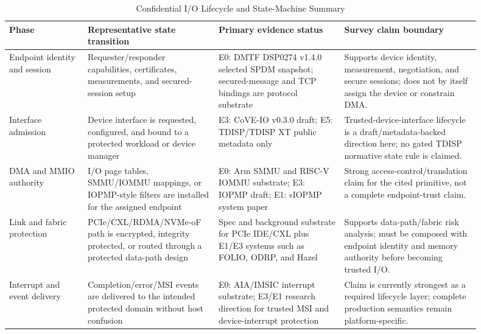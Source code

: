 \begin{table}[t]
\centering
\scriptsize
\caption{Confidential I/O Lifecycle and State-Machine Summary}
\label{tab:confidential_io_lifecycle}
\begin{tabular}{@{}p{0.15\linewidth}p{0.25\linewidth}p{0.24\linewidth}p{0.26\linewidth}@{}}
\toprule
\textbf{Phase} & \textbf{Representative state transition} & \textbf{Primary evidence status} & \textbf{Survey claim boundary} \\ \midrule
Endpoint identity and session & Requester/responder capabilities, certificates, measurements, and secured-session setup & E0: DMTF DSP0274 v1.4.0 selected SPDM snapshot; secured-message and TCP bindings are protocol substrate~\cite{dmtf_spdm_2025,dmtf_spdm_secured_messages_2025,dmtf_spdm_tcp_2024} & Supports device identity, measurement, negotiation, and secure sessions; does not by itself assign the device or constrain DMA. \\
Interface admission & Device interface is requested, configured, and bound to a protected workload or device manager & E3: CoVE-IO v0.3.0 draft; E5: TDISP/TDISP XT public metadata only~\cite{riscv_cove_io_2026,pcisig_tdisp_2022,pcisig_tdisp_xt_2025} & Trusted-device-interface lifecycle is a draft/metadata-backed direction here; no gated TDISP normative state rule is claimed. \\
DMA and MMIO authority & I/O page tables, SMMU/IOMMU mappings, or IOPMP-style filters are installed for the assigned endpoint & E0: Arm SMMU and RISC-V IOMMU substrate; E3: IOPMP draft; E1: sIOPMP system paper~\cite{arm_smmu_spec,riscv_iommu_2023,riscv_iopmp_2026,feng2024siopmp} & Strong access-control/translation claim for the cited primitive, not a complete endpoint-trust claim. \\
Link and fabric protection & PCIe/CXL/RDMA/NVMe-oF path is encrypted, integrity protected, or routed through a protected data-path design & Spec and background substrate for PCIe IDE/CXL plus E1/E3 systems such as FOLIO, ODRP, and Hazel~\cite{pcie_ide,cxl_spec,li2024folio,wang2025odrp,chrapek2026hazel} & Supports data-path/fabric risk analysis; must be composed with endpoint identity and memory authority before becoming trusted I/O. \\
Interrupt and event delivery & Completion/error/MSI events are delivered to the intended protected domain without host confusion & E0: AIA/IMSIC interrupt substrate; E3/E1 research direction for trusted MSI and device-interrupt protection~\cite{riscv_aia_2023,riscv_cove_io_2026,bertschi2026devlore} & Claim is currently strongest as a required lifecycle layer; complete production semantics remain platform-specific. \\

\end{tabular}
\end{table}
